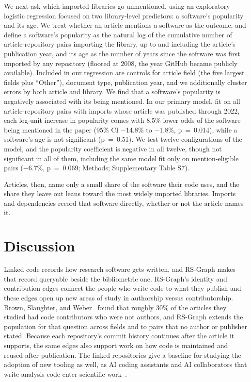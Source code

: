 \documentclass[pdflatex,sn-nature]{sn-jnl}%
\begin{document}
We next ask which imported libraries go unmentioned, using an exploratory logistic regression focused on two library-level predictors: a software's popularity and its age. We treat whether an article mentions a software as the outcome, and define a software's popularity as the natural log of the cumulative number of article-repository pairs importing the library, up to and including the article's publication year, and its age as the number of years since the software was first imported by any repository (floored at 2008, the year GitHub became publicly available). Included in our regression are controls for article field (the five largest fields plus ``Other''), document type, publication year, and we additionally cluster errors by both article and library. We find that a software's popularity is negatively associated with its being mentioned. In our primary model, fit on all article-repository pairs with imports whose article was published through 2022, each log-unit increase in popularity comes with 8.5\% lower odds of the software being mentioned in the paper (95\% CI $-$14.8\% to $-$1.8\%, p~=~0.014), while a software's age is not significant (p~=~0.51). We test twelve configurations of the model, and the popularity coefficient is negative in all twelve, though not significant in all of them, including the same model fit only on mention-eligible pairs ($-$6.7\%, p~=~0.069; Methods; Supplementary Table S7).

Articles, then, name only a small share of the software their code uses, and the share they leave out leans toward the most widely imported libraries. Imports and dependencies record that software directly, whether or not the article names it.

\section{Discussion}\label{sec:discussion}

Linked code records how research software gets written, and RS-Graph makes that record queryable beside the bibliometric one. RS-Graph's identity and contribution edges connect the people who write code to what they publish and these edges open up new areas of study in authorship versus contributorship. Brown, Slaughter, and Weber~\cite{brown2026code} found that roughly 30\% of the articles they studied had code contributors who were not authors, and RS-Graph extends the population for that question across fields and to pairs that no author or publisher stated. Because each repository's commit history continues after the article it supports, the same edges also support work on how code is maintained and reused after publication. The linked repositories give a baseline for studying the adoption of new tooling as well, as AI coding assistants and AI collaborators that write analysis code enter scientific work~\cite{shao2026sciscigpt}.
\end{document}
